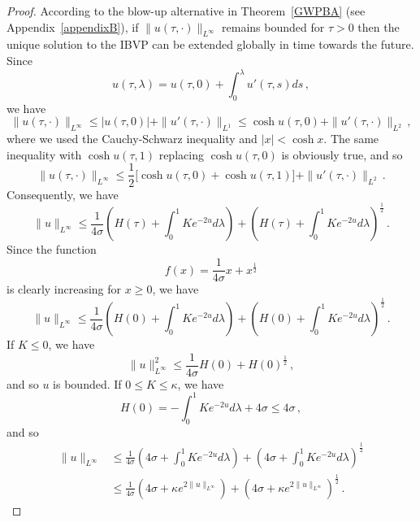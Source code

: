 \documentclass[10pt]{amsart}
\begin{document}
\begin{proof}
According to the blow-up alternative in Theorem~\ref{GWPBA} (see Appendix~\ref{appendixB}), if $\|u(\tau,\cdot)\|_{L^\infty}$ remains bounded for $\tau>0$ then the unique solution to the IBVP can be extended globally in time towards the future. Since
\begin{equation}
u(\tau,\lambda) = u(\tau,0) + \int_0^\lambda u'(\tau,s) ds \, ,
\end{equation}
we have
\begin{equation}
\|u(\tau,\cdot)\|_{L^\infty} \leq |u(\tau,0)| + \|u'(\tau,\cdot)\|_{L^1} \leq \cosh u(\tau,0) + \|u'(\tau,\cdot)\|_{L^2} \, ,
\end{equation}
where we used the Cauchy-Schwarz inequality and $|x|<\cosh x$. The same inequality with $\cosh u(\tau,1)$ replacing $\cosh u(\tau,0)$ is obviously true, and so
\begin{equation}
\|u(\tau,\cdot)\|_{L^\infty} \leq \frac12 \Big[ \cosh u(\tau,0) + \cosh u(\tau,1) \Big] + \|u'(\tau,\cdot)\|_{L^2} \, .
\end{equation}
Consequently, we have
\begin{equation}
\|u\|_{L^\infty} \leq \frac1{4\sigma} \left( H(\tau) + \int_0^1 K e^{-2u} d\lambda \right) +  \left( H(\tau) + \int_0^1 K e^{-2u} d\lambda \right)^\frac12 \, .
\end{equation}
Since the function
\begin{equation}
f(x)=\frac1{4\sigma}x + x^\frac12
\end{equation}
is clearly increasing for $x \geq 0$, we have
\begin{equation}
\|u\|_{L^\infty} \leq \frac1{4\sigma} \left( H(0) + \int_0^1 K e^{-2u} d\lambda \right) +  \left( H(0) + \int_0^1 K e^{-2u} d\lambda \right)^\frac12 \, .
\end{equation}
If $K \leq 0$, we have
\begin{equation}
\|u\|^2_{L^\infty} \leq \frac1{4\sigma} H(0) +  H(0)^\frac12 \, ,
\end{equation}
and so $u$ is bounded. If $0 \leq K \leq \kappa$, we have
\begin{equation}
H(0) = - \int_0^1 K e^{-2u} d\lambda + 4 \sigma \leq 4\sigma \, ,
\end{equation}
and so
\begin{align}
\|u\|_{L^\infty} & \leq \frac1{4\sigma} \left( 4\sigma + \int_0^1 K e^{-2u} d\lambda \right) +  \left( 4\sigma + \int_0^1 K e^{-2u} d\lambda \right)^\frac12 \nonumber \\
& \leq \frac1{4\sigma} \left( 4\sigma + \kappa e^{2 \|u\|_{L^\infty}} \right) +  \left( 4\sigma + \kappa e^{2 \|u\|_{L^\infty}} \right)^\frac12 \, . \label{ineq2}

\end{align}
\end{proof}
\end{document}
